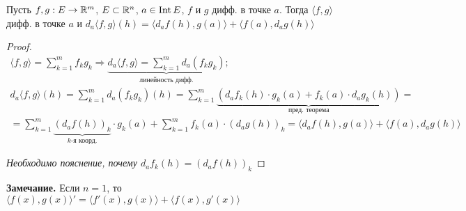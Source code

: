 \begin{theorem}
    Пусть $f, g : E \to \mathbb{R}^m$, $E \subset \mathbb{R}^n$, $a \in \operatorname{Int} E$,
    $f$ и $g$ дифф. в точке $a$. Тогда $\langle f, g \rangle$
    дифф. в точке $a$ и $d_a \langle f, g \rangle (h) =
    \langle d_a f(h), g(a) \rangle + \langle f(a), d_a g(h) \rangle$
\end{theorem}
\begin{proof}
    \begin{gather*}
        \langle f, g \rangle = \sum_{k = 1}^m f_k g_k
        \Rightarrow 
        \underbrace{d_a \langle f, g \rangle = 
        \sum_{k = 1}^m d_a (f_k g_k)}
        _\text{линейность дифф.}; \\
        d_a \langle f, g \rangle (h) = 
        \sum_{k = 1}^m d_a (f_k g_k)(h) =
        \sum_{k = 1}^m 
        \underbrace{(d_a f_k (h) \cdot g_k(a) + 
        f_k (a) \cdot d_a g_k(h))}_{\text{пред. теорема}} = \\
        = \sum_{k = 1}^m 
        \underbrace{(d_a f(h))_k}_{\text{$k$-я коорд.}}
        \cdot g_k(a) + 
        \sum_{k = 1}^m f_k (a) \cdot (d_a g(h))_k =
        \langle d_a f(h), g(a) \rangle + \langle f(a), d_a g(h) \rangle
    \end{gather*}

    \textit{Необходимо пояснение, почему $d_a f_k (h) = (d_a f(h))_k$}
\end{proof}
\textbf{Замечание.} Если $n = 1$, то $\langle f(x), g(x) \rangle' =
\langle f'(x), g(x) \rangle + \langle f(x), g'(x) \rangle$
